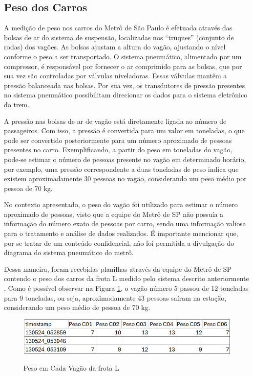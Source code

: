\documentclass[acronym,symbols,table]{fei}
\begin{document}
\subsection{Peso dos Carros} 

    A medição de peso nos carros do Metrô de São Paulo é efetuada através das bolsas de ar do sistema de suspensão, localizadas nos “truques” (conjunto de rodas) dos vagões. As bolsas ajustam a altura do vagão, ajustando o nível conforme o peso a ser transportado. O sistema pneumático, alimentado por um compressor, é responsável por fornecer o ar comprimido para as bolsas, que por sua vez são controladas por válvulas niveladoras. Essas válvulas mantêm a pressão balanceada nas bolsas. Por sua vez, os transdutores de pressão presentes no sistema pneumático possibilitam direcionar os dados para o sistema eletrônico do trem.
    
    A pressão nas bolsas de ar de vagão está diretamente ligada ao número de passageiros. Com isso, a pressão é convertida para um valor em toneladas, o que pode ser convertido posteriormente para um número aproximado de pessoas presentes no carro. Exemplificando, a partir do peso em toneladas do vagão, pode-se estimar o número de pessoas presente no vagão em determinado horário, por exemplo, uma pressão correspondente a duas toneladas de peso indica que existem aproximadamente 30 pessoas no vagão, considerando um peso médio por pessoa de 70 kg.
    
    No contexto apresentado, o peso do vagão foi utilizado para estimar o número aproximado de pessoas, visto que a equipe do Metrô de SP não possuía a informação do número exato de pessoas por carro, sendo uma informação valiosa para o tratamento e análise de dados realizados. É importante mencionar que, por se tratar de um conteúdo confidencial, não foi permitida a divulgação do diagrama do sistema pneumático do metrô.
    
    Dessa maneira, foram recebidas planilhas através da equipe do Metrô de SP contendo o peso dos carros da frota L medido pelo sistema descrito anteriormente \cite{metrosp2024}. Como é possível observar na Figura \ref{fig:Peso_Carros}, o vagão número 5 passou de 12 toneladas para 9 toneladas, ou seja, aproximadamente 43 pessoas saíram na estação, considerando um peso médio de pessoa de 70 kg.
    
    \begin{figure}[!htb]
    \centering
    \caption{Peso em Cada Vagão da frota L}
    \includegraphics[width=1\linewidth]{Imagens/Peso_Carros.png}
    \label{fig:Peso_Carros}
    \end{figure}
\end{document}
